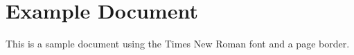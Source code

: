 \documentclass{article}
\begin{document}
\section*{Example Document}

This is a sample document using the Times New Roman font and a page border.

\lipsum[1]
\end{document}
